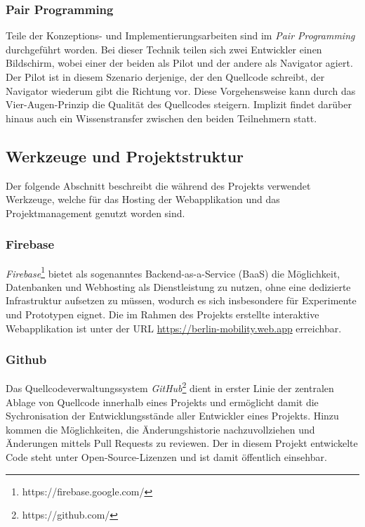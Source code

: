 \subsubsection{Pair Programming}
\label{pair_programming}

Teile der Konzeptions- und Implementierungsarbeiten sind im \emph{Pair Programming} durchgeführt worden. Bei dieser Technik teilen sich zwei Entwickler einen Bildschirm, wobei einer der beiden als Pilot und der andere als Navigator agiert. Der Pilot ist in diesem Szenario derjenige, der den Quellcode schreibt, der Navigator wiederum gibt die Richtung vor. Diese Vorgehensweise kann durch das Vier-Augen-Prinzip die Qualität des Quellcodes steigern. Implizit findet darüber hinaus auch ein Wissenstransfer zwischen den beiden Teilnehmern statt.

\subsection{Werkzeuge und Projektstruktur}
\label{werkzeuge_und_projektstruktur}

Der folgende Abschnitt beschreibt die während des Projekts verwendet Werkzeuge, welche für das Hosting der Webapplikation und das Projektmanagement genutzt worden sind.

\subsubsection{Firebase}
\label{firebase}

\emph{Firebase}\footnote{https://firebase.google.com/} bietet als sogenanntes Backend-as-a-Service (BaaS) die Möglichkeit, Datenbanken und Webhosting als Dienstleistung zu nutzen, ohne eine dedizierte Infrastruktur aufsetzen zu müssen, wodurch es sich insbesondere für Experimente und Prototypen eignet. Die im Rahmen des Projekts erstellte interaktive Webapplikation ist unter der URL \url{https://berlin-mobility.web.app} erreichbar.

\subsubsection{Github}
\label{github}

Das Quellcodeverwaltungssystem \emph{GitHub}\footnote{https://github.com/} dient in erster Linie der zentralen Ablage von Quellcode innerhalb eines Projekts und ermöglicht damit die Sychronisation der Entwicklungsstände aller Entwickler eines Projekts. Hinzu kommen die Möglichkeiten, die Änderungshistorie nachzuvollziehen und Änderungen mittels Pull Requests zu reviewen. Der in diesem Projekt entwickelte Code steht unter Open-Source-Lizenzen und ist damit öffentlich einsehbar.


